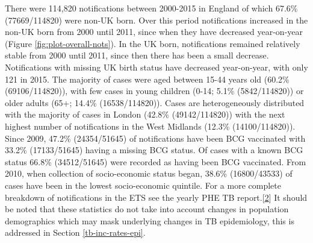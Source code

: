 \documentclass[11pt,twoside]{bristolthesis}
\begin{document}
  There were 114,820 notifications between 2000-2015 in England of which 67.6\% (77669/114820) were non-UK born. Over this period notifications increased in the non-UK born from 2000 until 2011, since when they have decreased year-on-year (Figure \ref{fig:plot-overall-nots}). In the UK born, notifications remained relatively stable from 2000 until 2011, since then there has been a small decrease. Notifications with missing UK birth status have decreased year-on-year, with only 121 in 2015. The majority of cases were aged between 15-44 years old (60.2\% (69106/114820)), with few cases in young children (0-14; 5.1\% (5842/114820)) or older adults (65+; 14.4\% (16538/114820)). Cases are heterogeneously distributed with the majority of cases in London (42.8\% (49142/114820)) with the next highest number of notifications in the West Midlands (12.3\% (14100/114820)). Since 2009, 47.2\% (24354/51645) of notifications have been BCG vaccinated with 33.2\% (17133/51645) having a missing BCG status. Of cases with a known BCG status 66.8\% (34512/51645) were recorded as having been BCG vaccinated. From 2010, when collection of socio-economic status began, 38.6\% (16800/43533) of cases have been in the lowest socio-economic quintile. For a more complete breakdown of notifications in the ETS see the yearly PHE TB report.{[}\protect\hyperlink{ref-PHE2017}{2}{]} It should be noted that these statistics do not take into account changes in population demographics which may mask underlying changes in TB epidemiology, this is addressed in Section \ref{tb-inc-rates-epi}.
\end{document}
